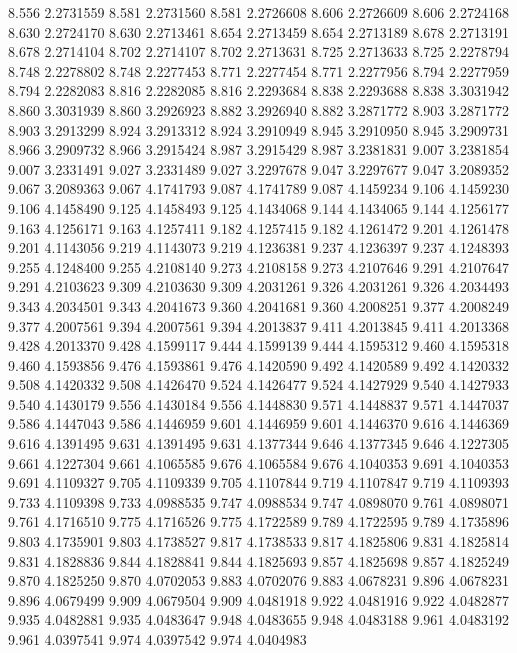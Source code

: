 8.556 2.2731559
8.581 2.2731560
8.581 2.2726608
8.606 2.2726609
8.606 2.2724168
8.630 2.2724170
8.630 2.2713461
8.654 2.2713459
8.654 2.2713189
8.678 2.2713191
8.678 2.2714104
8.702 2.2714107
8.702 2.2713631
8.725 2.2713633
8.725 2.2278794
8.748 2.2278802
8.748 2.2277453
8.771 2.2277454
8.771 2.2277956
8.794 2.2277959
8.794 2.2282083
8.816 2.2282085
8.816 2.2293684
8.838 2.2293688
8.838 3.3031942
8.860 3.3031939
8.860 3.2926923
8.882 3.2926940
8.882 3.2871772
8.903 3.2871772
8.903 3.2913299
8.924 3.2913312
8.924 3.2910949
8.945 3.2910950
8.945 3.2909731
8.966 3.2909732
8.966 3.2915424
8.987 3.2915429
8.987 3.2381831
9.007 3.2381854
9.007 3.2331491
9.027 3.2331489
9.027 3.2297678
9.047 3.2297677
9.047 3.2089352
9.067 3.2089363
9.067 4.1741793
9.087 4.1741789
9.087 4.1459234
9.106 4.1459230
9.106 4.1458490
9.125 4.1458493
9.125 4.1434068
9.144 4.1434065
9.144 4.1256177
9.163 4.1256171
9.163 4.1257411
9.182 4.1257415
9.182 4.1261472
9.201 4.1261478
9.201 4.1143056
9.219 4.1143073
9.219 4.1236381
9.237 4.1236397
9.237 4.1248393
9.255 4.1248400
9.255 4.2108140
9.273 4.2108158
9.273 4.2107646
9.291 4.2107647
9.291 4.2103623
9.309 4.2103630
9.309 4.2031261
9.326 4.2031261
9.326 4.2034493
9.343 4.2034501
9.343 4.2041673
9.360 4.2041681
9.360 4.2008251
9.377 4.2008249
9.377 4.2007561
9.394 4.2007561
9.394 4.2013837
9.411 4.2013845
9.411 4.2013368
9.428 4.2013370
9.428 4.1599117
9.444 4.1599139
9.444 4.1595312
9.460 4.1595318
9.460 4.1593856
9.476 4.1593861
9.476 4.1420590
9.492 4.1420589
9.492 4.1420332
9.508 4.1420332
9.508 4.1426470
9.524 4.1426477
9.524 4.1427929
9.540 4.1427933
9.540 4.1430179
9.556 4.1430184
9.556 4.1448830
9.571 4.1448837
9.571 4.1447037
9.586 4.1447043
9.586 4.1446959
9.601 4.1446959
9.601 4.1446370
9.616 4.1446369
9.616 4.1391495
9.631 4.1391495
9.631 4.1377344
9.646 4.1377345
9.646 4.1227305
9.661 4.1227304
9.661 4.1065585
9.676 4.1065584
9.676 4.1040353
9.691 4.1040353
9.691 4.1109327
9.705 4.1109339
9.705 4.1107844
9.719 4.1107847
9.719 4.1109393
9.733 4.1109398
9.733 4.0988535
9.747 4.0988534
9.747 4.0898070
9.761 4.0898071
9.761 4.1716510
9.775 4.1716526
9.775 4.1722589
9.789 4.1722595
9.789 4.1735896
9.803 4.1735901
9.803 4.1738527
9.817 4.1738533
9.817 4.1825806
9.831 4.1825814
9.831 4.1828836
9.844 4.1828841
9.844 4.1825693
9.857 4.1825698
9.857 4.1825249
9.870 4.1825250
9.870 4.0702053
9.883 4.0702076
9.883 4.0678231
9.896 4.0678231
9.896 4.0679499
9.909 4.0679504
9.909 4.0481918
9.922 4.0481916
9.922 4.0482877
9.935 4.0482881
9.935 4.0483647
9.948 4.0483655
9.948 4.0483188
9.961 4.0483192
9.961 4.0397541
9.974 4.0397542
9.974 4.0404983
